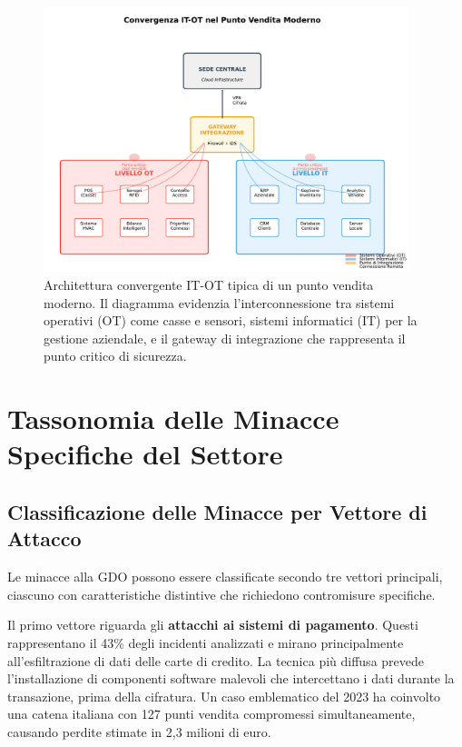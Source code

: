 \begin{figure}[htbp]
\centering
\includegraphics[width=0.95\textwidth]{thesis_figures/cap2/fig_2_2_convergenza_it_ot.pdf}
\caption{Architettura convergente IT-OT tipica di un punto vendita moderno. Il diagramma evidenzia l'interconnessione tra sistemi operativi (OT) come casse e sensori, sistemi informatici (IT) per la gestione aziendale, e il gateway di integrazione che rappresenta il punto critico di sicurezza.}
\label{fig:convergenza_it_ot}
\end{figure}

\section{Tassonomia delle Minacce Specifiche del Settore}
\label{sec:cap2_tassonomia}

\subsection{Classificazione delle Minacce per Vettore di Attacco}
\label{subsec:vettori_attacco}

Le minacce alla GDO possono essere classificate secondo tre vettori principali, ciascuno con caratteristiche distintive che richiedono contromisure specifiche.

Il primo vettore riguarda gli \textbf{attacchi ai sistemi di pagamento}. Questi rappresentano il 43\% degli incidenti analizzati e mirano principalmente all'esfiltrazione di dati delle carte di credito. La tecnica più diffusa prevede l'installazione di componenti software malevoli\autocite{trustwave2024pos} che intercettano i dati durante la transazione, prima della cifratura. Un caso emblematico del 2023 ha coinvolto una catena italiana con 127 punti vendita compromessi simultaneamente, causando perdite stimate in 2,3 milioni di euro.

